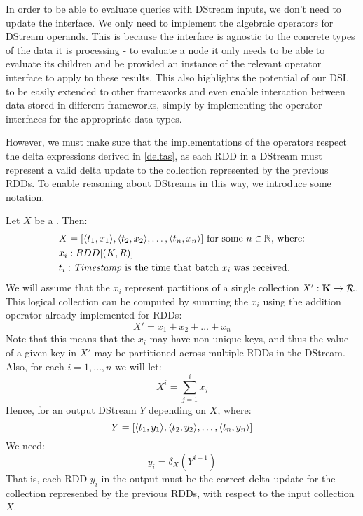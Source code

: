 In order to be able to evaluate queries with DStream inputs, we don't need to update the  interface. We only need to implement the algebraic operators for DStream operands.  This is because the  interface is agnostic to the concrete types of the data it is processing - to evaluate a node it only needs to be able to evaluate its children and be provided an instance of the relevant operator interface to apply to these results. This also highlights the potential of our DSL to be easily extended to other frameworks and even enable interaction between data stored in different frameworks, simply by implementing the operator interfaces for the appropriate data types.

However, we must make sure that the implementations of the operators respect the delta expressions derived in \ref{deltas}, as each RDD in a DStream must represent a valid delta update to the collection represented by the previous RDDs. To enable reasoning about DStreams in this way, we introduce some notation.
\par \noindent Let $X$ be a . Then:
\begin{equation*}
\begin{split}
&X = [\langle t_1, x_1 \rangle, \langle t_2, x_2 \rangle, \dots, \langle t_n, x_n \rangle] \textrm{ for some $n \in \mathbb{N}$, where:} \\
&x_i: RDD[(K,R)] \\
&t_i: \textrm{\textit{Timestamp}} \textrm{ is the time that batch $x_i$ was received.}
\end{split}
\end{equation*}
We will assume that the $x_i$ represent partitions of a single collection $X': \mathbf{K} \rightarrow \mathcal{R}$. This logical collection can be computed by summing the $x_i$ using the addition operator already implemented for RDDs:
\begin{equation*}
X' = x_1 + x_2 + \dots + x_n
\end{equation*}
Note that this means that the $x_i$ may have non-unique keys, and thus the value of a given key in $X'$ may be partitioned across multiple RDDs in the DStream.
\vs
Also, for each $i = 1, \dots, n$ we will let:
\begin{equation*}
X^i = \sum_{j = 1}^i{x_j}
\end{equation*}
Hence, for an output DStream $Y$ depending on $X$, where:
\begin{equation*}
Y = [\langle t_1, y_1 \rangle, \langle t_2, y_2 \rangle, \dots, \langle t_n, y_n \rangle]
\end{equation*}
We need:
\begin{equation*}
y_i = \delta_X(Y^{i-1})
\end{equation*}
That is, each RDD $y_i$ in the output must be the correct delta update for the collection represented by the previous RDDs, with respect to the input collection $X$.

